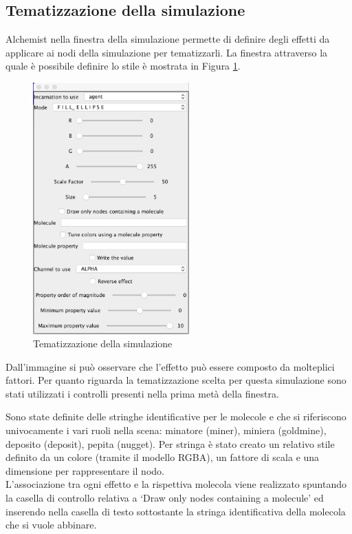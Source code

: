 \subsection{Tematizzazione della simulazione}
Alchemist nella finestra della simulazione permette di definire degli effetti da applicare ai nodi della simulazione per tematizzarli. La finestra attraverso la quale è possibile definire lo stile è mostrata in Figura \ref{fig:tematizzazioneSimulazione}.

\begin{figure}[h] %
\begin{center} %
\includegraphics[width=6cm]{images/tematizzazioneSimulazione.png} %
\caption[Tematizzazione della simulazione]{Tematizzazione della simulazione} \label{fig:tematizzazioneSimulazione}
\end{center}
\end{figure} 

Dall'immagine si può osservare che l'effetto può essere composto da molteplici fattori.
Per quanto riguarda la tematizzazione scelta per questa simulazione sono stati utilizzati i controlli presenti nella prima metà della finestra.
\newline

Sono state definite delle stringhe identificative per le molecole e che si riferiscono univocamente i vari ruoli nella scena: minatore (miner), miniera (goldmine), deposito (deposit), pepita (nugget).
Per stringa è stato creato un relativo stile definito da un colore (tramite il modello RGBA), un fattore di scala e una dimensione per rappresentare il nodo.
\\
L'associazione tra ogni effetto e la rispettiva molecola viene realizzato spuntando la casella di controllo relativa a `Draw only nodes containing a molecule' ed inserendo nella casella di testo sottostante la stringa identificativa della molecola che si vuole abbinare.
\newline

